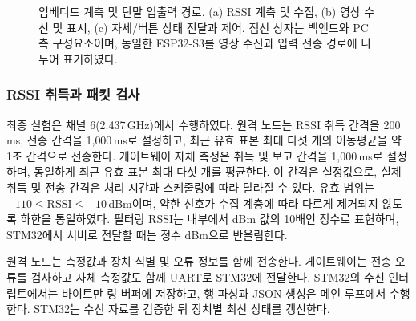 \documentclass[11pt,a4paper]{article}
\begin{document}
\begin{figure}[htbp]
  \caption{임베디드 계측 및 단말 입출력 경로. (a) RSSI 계측 및 수집,
  (b) 영상 수신 및 표시, (c) 자세/버튼 상태 전달과 제어. 점선 상자는 백엔드와 PC 측 구성요소이며,
  동일한 ESP32-S3를 영상 수신과 입력 전송 경로에 나누어 표기하였다.}
  \label{fig:embedded-architecture}
\end{figure}


\subsubsection{RSSI 취득과 패킷 검사}

최종 실험은 채널 6(2.437\,GHz)에서 수행하였다. 원격 노드는 RSSI 취득 간격을 200\,ms,
전송 간격을 1{,}000\,ms로 설정하고, 최근 유효 표본 최대 다섯 개의 이동평균을 약 1초 간격으로 전송한다.
게이트웨이 자체 측정은 취득 및 보고 간격을 1{,}000\,ms로 설정하며, 동일하게 최근 유효 표본 최대
다섯 개를 평균한다. 이 간격은 설정값으로, 실제 취득 및 전송 간격은 처리 시간과 스케줄링에 따라 달라질 수 있다.
유효 범위는
$-110\leq\mathrm{RSSI}\leq-10$\,dBm이며, 약한 신호가 수집 계층에 따라 다르게 제거되지 않도록
하한을 통일하였다. 필터링 RSSI는 내부에서 dBm 값의 10배인 정수로 표현하며, STM32에서 서버로 전달할
때는 정수 dBm으로 반올림한다.

원격 노드는 측정값과 장치 식별 및 오류 정보를 함께 전송한다. 게이트웨이는 전송 오류를 검사하고 자체
측정값도 함께 UART로 STM32에 전달한다. STM32의 수신 인터럽트에서는 바이트만 링 버퍼에 저장하고,
행 파싱과 JSON 생성은 메인 루프에서 수행한다. STM32는 수신 자료를 검증한 뒤 장치별 최신 상태를 갱신한다.
\end{document}

